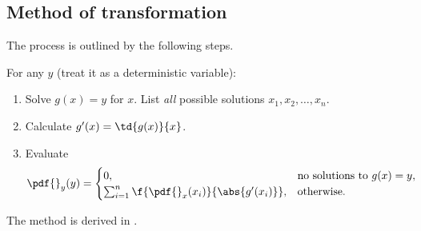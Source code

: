 \subsection{Method of transformation}
The process is outlined by the following steps. 

\begin{myBlackBox}
    For any $y$ (treat it as a deterministic variable):
    \begin{enumerate}
        \item Solve $g(x)=y$ for $x$. List \emph{all} possible solutions $x_{1},x_{2},\ldots,x_{n}$.
        \item Calculate $g'(x) = \td{g(x)}{x}$.
        \item Evaluate 
        \begin{align}
            \pdf{}_{y}(y) 
            &= 
            \begin{cases}
                0, &\text{no solutions to }g(x)=y,\\
                \sum_{i=1}^{n} \f{\pdf{}_{x}(x_{i})}{\abs{g'(x_{i})}}, &\text{otherwise}.
            \end{cases}
        \end{align}
    \end{enumerate}
\end{myBlackBox}
The method is derived in \cite[Sec.~2.6.2]{murphy_machine_2012}. 

